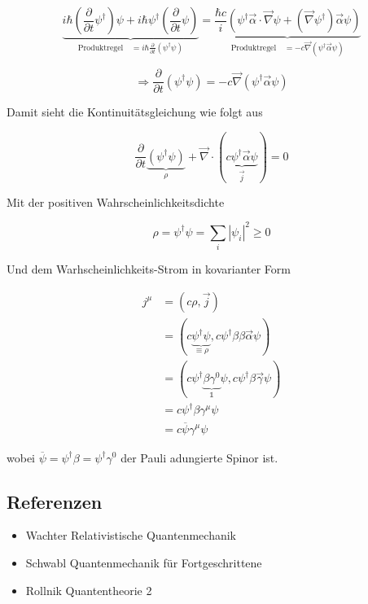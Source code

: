 \begin{equation}
  \label{eq:21}
  \underbrace{ i\hbar(\frac{\partial}{\partial t} \psi^\dagger)\psi+i\hbar\psi^\dagger (\frac{\partial}{\partial t} \psi)}_{\text{Produktregel} \quad = i\hbar\frac{\partial}{\partial t} (\psi^\dagger\psi) } =\underbrace{\frac{\hbar c}{i}(\psi^\dagger \vec \alpha\cdot\vec\nabla\psi+(\vec\nabla\psi^\dagger)\vec\alpha \psi)}_{\text{Produktregel} \quad = -c\vec\nabla(\psi^\dagger\vec\alpha\psi)}
\end{equation}


\[\Rightarrow \frac{\partial}{\partial t}(\psi^\dagger\psi) = -c\vec\nabla(\psi^\dagger\vec\alpha\psi)\]

Damit sieht die Kontinuitätsgleichung wie folgt aus


\begin{equation}
  \label{eq:22}
  \boxed{ \frac{\partial}{\partial t}\underbrace{(\psi^\dagger\psi) }_{\rho}+\vec\nabla\cdot(\underbrace{c\psi^\dagger\vec\alpha\psi }_{\vec j})=0 }
\end{equation}

Mit der positiven Wahrscheinlichkeitsdichte


\begin{equation}
  \label{eq:23}
  \rho =\psi^\dagger\psi = \sum_i|\psi_i|^2\geq 0
\end{equation}

Und dem Warhscheinlichkeits-Strom in kovarianter Form

\begin{align}
j^\mu &= (c\rho ,\vec j )\\
&= (c\underbrace{\psi^\dagger\psi}_{\equiv \rho} ,c\psi^\dagger\beta\beta\vec\alpha\psi )\\
&= (c\psi^\dagger\underbrace{\beta\gamma^0}_{\mathbb 1}\psi ,c\psi^\dagger\beta\vec\gamma\psi )\\
&= c\psi^\dagger \beta\gamma^\mu \psi\\
&= c\overline \psi\gamma^\mu \psi
\end{align}

wobei \(\overline \psi = \psi^\dagger\beta=\psi^\dagger\gamma^0\) der Pauli adungierte Spinor ist.



\subsection*{Referenzen}
\begin{itemize}
\item Wachter Relativistische Quantenmechanik
\item Schwabl Quantenmechanik für Fortgeschrittene
\item Rollnik Quantentheorie 2
\end{itemize}


